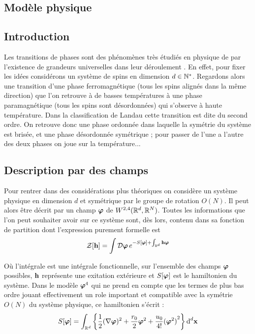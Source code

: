 \documentclass[10pt]{article}
\begin{document}
\begin{multicols}{2}

\section{Modèle physique}

\subsection{Introduction}

Les transitions de phases sont des phénomènes très étudiés en physique de par l'existence de grandeurs universelles dans leur déroulement \cite{bellac2012}. En effet, pour fixer les idées considérons un système de spins en dimension $d \in \mathbb{N}^*$. Regardons alors une transition d'une phase ferromagnétique (tous les spins alignés dans la même direction) que l'on retrouve à de basses températures à une phase paramagnétique (tous les spins sont désordonnées) qui s'observe à haute température. Dans la classification de Landau cette transition est dite du second ordre. On retrouve donc une phase ordonnée dans laquelle la symétrie du système est brisée, et une phase désordonnée symétrique ; pour passer de l'une a l'autre des deux phases on joue sur la température...


\vspace*{11pt}

\subsection{Description par des champs}

Pour rentrer dans des considérations plus théoriques on considère un système physique en dimension $d$ et symétrique par le groupe de rotation $O(N)$. Il peut alors être décrit par un champ $\boldsymbol{ \varphi}$ de $W^{2,4}(\mathbb{R}^d, \mathbb{R}^N)$. Toutes les informations que l'on peut souhaiter avoir sur ce système sont, dès lors, contenu dans sa fonction de partition dont l'expression purement formelle est 
\begin{equation}
\mathcal{Z}[{\bf h}] = \int \mathcal{D} \boldsymbol{ \varphi} \, e^{-S[\boldsymbol{ \varphi}] + \int_{\mathbb{R}^d} {\bf h} \boldsymbol{ \varphi}} 
\end{equation} 

Où l'intégrale est une intégrale fonctionnelle, sur l'ensemble des champs $\boldsymbol{ \varphi}$ possibles, ${\bf h}$ représente une exitation extérieure et $S[\boldsymbol{ \varphi}]$ est le hamiltonien du système. Dans le modèle $\boldsymbol{ \varphi}^4$ qui ne prend en compte que les termes de plus bas ordre jouant effectivement un role important et compatible avec la symétrie $O(N)$ du système physique, ce hamiltonien s'écrit : 
\begin{equation}
  S[\boldsymbol{ \varphi}] = \int_{\mathbb{R}^d} \left\{ \frac{1}{2} (\nabla \boldsymbol{ \varphi})^2 + \frac{r_0}{2}\boldsymbol{ \varphi}^2  + \frac{u_0}{4!} {(\boldsymbol{ \varphi}^2)}^2 \right\} \text{d}^d {\bf x}
\end{equation}


\end{multicols}
\end{document}
